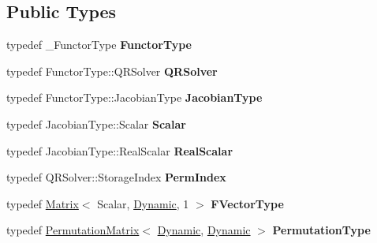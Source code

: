 \subsection*{Public Types}
\begin{DoxyCompactItemize}
\item 
\mbox{\label{class_eigen_1_1_levenberg_marquardt_a2aaf05c8858ad8f48f655349cd31a21e}} 
typedef \+\_\+\+Functor\+Type {\bfseries Functor\+Type}
\item 
\mbox{\label{class_eigen_1_1_levenberg_marquardt_a0d5fc4346945f92aaeac1c6f60e7223c}} 
typedef Functor\+Type\+::\+Q\+R\+Solver {\bfseries Q\+R\+Solver}
\item 
\mbox{\label{class_eigen_1_1_levenberg_marquardt_a46de8f98bf9a71684e17c81d1190c96f}} 
typedef Functor\+Type\+::\+Jacobian\+Type {\bfseries Jacobian\+Type}
\item 
\mbox{\label{class_eigen_1_1_levenberg_marquardt_a7986f6a71de42b4b03be67b8884ee220}} 
typedef Jacobian\+Type\+::\+Scalar {\bfseries Scalar}
\item 
\mbox{\label{class_eigen_1_1_levenberg_marquardt_a6e285e5f1243c1b95e5c05dbf7fb049f}} 
typedef Jacobian\+Type\+::\+Real\+Scalar {\bfseries Real\+Scalar}
\item 
\mbox{\label{class_eigen_1_1_levenberg_marquardt_a33acdaa2cd3629b784aced44c6434f16}} 
typedef Q\+R\+Solver\+::\+Storage\+Index {\bfseries Perm\+Index}
\item 
\mbox{\label{class_eigen_1_1_levenberg_marquardt_af89008c12d6a15c46f84618473ba7722}} 
typedef \hyperlink{group___core___module_class_eigen_1_1_matrix}{Matrix}$<$ Scalar, \hyperlink{namespace_eigen_ad81fa7195215a0ce30017dfac309f0b2}{Dynamic}, 1 $>$ {\bfseries F\+Vector\+Type}
\item 
\mbox{\label{class_eigen_1_1_levenberg_marquardt_aa6348163797848feba7d1fef97e4d1ad}} 
typedef \hyperlink{group___core___module_class_eigen_1_1_permutation_matrix}{Permutation\+Matrix}$<$ \hyperlink{namespace_eigen_ad81fa7195215a0ce30017dfac309f0b2}{Dynamic}, \hyperlink{namespace_eigen_ad81fa7195215a0ce30017dfac309f0b2}{Dynamic} $>$ {\bfseries Permutation\+Type}

\end{DoxyCompactItemize}
